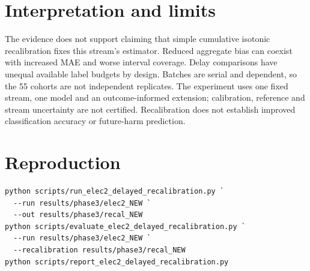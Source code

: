 \documentclass[10pt,a4paper]{article}
\begin{document}
\section{Interpretation and limits}
The evidence does not support claiming that simple cumulative isotonic recalibration fixes this stream's estimator. Reduced aggregate bias can coexist with increased MAE and worse interval coverage. Delay comparisons have unequal available label budgets by design. Batches are serial and dependent, so the 55 cohorts are not independent replicates. The experiment uses one fixed stream, one model and an outcome-informed extension; calibration, reference and stream uncertainty are not certified. Recalibration does not establish improved classification accuracy or future-harm prediction.
\section{Reproduction}
\begin{verbatim}
python scripts/run_elec2_delayed_recalibration.py `
  --run results/phase3/elec2_NEW `
  --out results/phase3/recal_NEW
python scripts/evaluate_elec2_delayed_recalibration.py `
  --run results/phase3/elec2_NEW `
  --recalibration results/phase3/recal_NEW
python scripts/report_elec2_delayed_recalibration.py
\end{verbatim}
\end{document}
